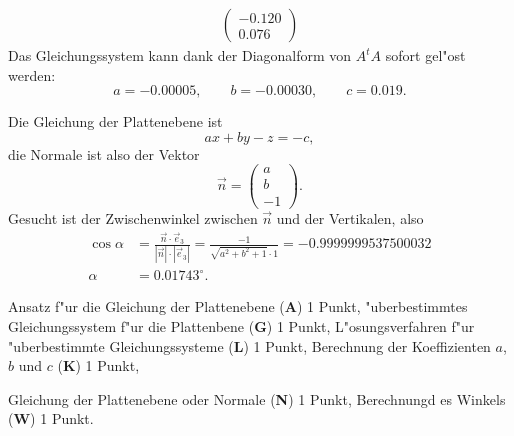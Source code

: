 \begin{loesung}
\begin{teilaufgaben}
\begin{align*}
\begin{pmatrix}
-0.120\\
0.076
\end{pmatrix}
\end{align*}
Das Gleichungssystem kann dank der Diagonalform von $A^tA$
sofort gel"ost werden:
\[
a=-0.00005,\qquad b=-0.00030,\qquad c=0.019.
\]
\item
Die Gleichung der Plattenebene ist
\[
ax+by-z=-c,
\]
die Normale ist also der Vektor
\[
\vec n=\begin{pmatrix}a\\b\\-1\end{pmatrix}.
\]
Gesucht ist der Zwischenwinkel zwischen $\vec n$ und der Vertikalen,
also
\begin{align*}
\cos\alpha&=\frac{\vec n\cdot\vec e_3}{|\vec n|\cdot|\vec e_3|}
=\frac{-1}{\sqrt{a^2+b^2+1}\cdot 1}
=-0.9999999537500032\\
\alpha&=0.01743^\circ.
\end{align*}
\end{teilaufgaben}
\end{loesung}

\begin{bewertung}
\begin{teilaufgaben}
\item
Ansatz f"ur die Gleichung der Plattenebene (\textbf{A}) 1 Punkt,
"uberbestimmtes Gleichungssystem f"ur die Plattenbene (\textbf{G}) 1 Punkt,
L"osungsverfahren f"ur "uberbestimmte Gleichungssysteme (\textbf{L}) 1 Punkt,
Berechnung der Koeffizienten $a$, $b$ und $c$ (\textbf{K}) 1 Punkt,
\item
Gleichung der Plattenebene oder Normale (\textbf{N}) 1 Punkt,
Berechnungd es Winkels (\textbf{W}) 1 Punkt.
\end{teilaufgaben}
\end{bewertung}
